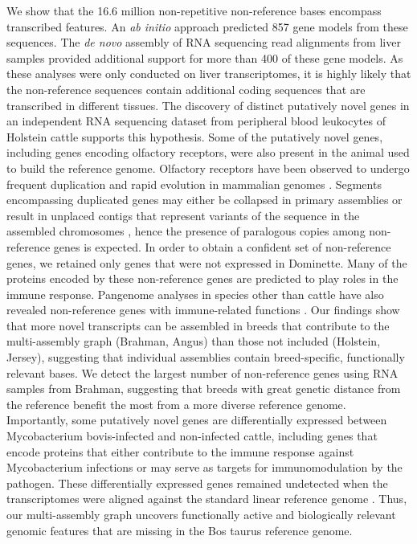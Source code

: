 \documentclass[../main.tex]{subfiles}
\begin{document}
We show that the 16.6 million non-repetitive non-reference bases encompass transcribed features. An \emph{ab initio} approach predicted 857 gene models from these sequences. The \emph{de novo} assembly of RNA sequencing read alignments from liver samples provided additional support for more than 400 of these gene models. As these analyses were only conducted on liver transcriptomes, it is highly likely that the non-reference sequences contain additional coding sequences that are transcribed in different tissues. The discovery of distinct putatively novel genes in an independent RNA sequencing dataset from peripheral blood leukocytes of Holstein cattle supports this hypothesis. Some of the putatively novel genes, including genes encoding olfactory receptors, were also present in the animal used to build the reference genome. Olfactory receptors have been observed to undergo frequent duplication and rapid evolution in mammalian genomes \citep{li2017comprehensive,hughes2018birth}. Segments encompassing duplicated genes may either be collapsed in primary assemblies or result in unplaced contigs that represent variants of the sequence in the assembled chromosomes \citep{vollger2019long,kelley2010detection}, hence the presence of paralogous copies among non-reference genes is expected. In order to obtain a confident set of non-reference genes, we retained only genes that were not expressed in Dominette. Many of the proteins encoded by these non-reference genes are predicted to play roles in the immune response. Pangenome analyses in species other than cattle have also revealed non-reference genes with immune-related functions \citep{li2017comprehensive,gordon2017extensive,golicz2020pangenomics}. Our findings show that more novel transcripts can be assembled in breeds that contribute to the multi-assembly graph (Brahman, Angus) than those not included (Holstein, Jersey), suggesting that individual assemblies contain breed-specific, functionally relevant bases. We detect the largest number of non-reference genes using RNA samples from Brahman, suggesting that breeds with great genetic distance from the reference benefit the most from a more diverse reference genome. Importantly, some putatively novel genes are differentially expressed between Mycobacterium bovis-infected and non-infected cattle, including genes that encode proteins that either contribute to the immune response against Mycobacterium infections or may serve as targets for immunomodulation by the pathogen. These differentially expressed genes remained undetected when the transcriptomes were aligned against the standard linear reference genome \citep{mcloughlin2014rna}. Thus, our multi-assembly graph uncovers functionally active and biologically relevant genomic features that are missing in the Bos taurus reference genome.
\end{document}
